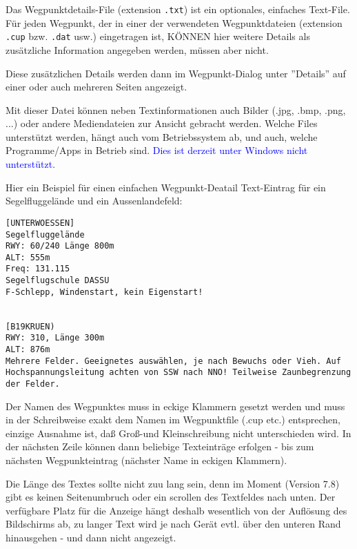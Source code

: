 %
%
%

Das Wegpunktdetails-File (extension \verb|.txt|) ist ein optionales, einfaches Text-File. Für jeden Wegpunkt, der in einer der verwendeten Wegpunktdateien (extension \verb|.cup| bzw. \verb|.dat| usw.) eingetragen ist, KÖNNEN hier weitere Details als zusätzliche Information angegeben werden, müssen aber nicht. 

Diese zusätzlichen Details werden dann im Wegpunkt-Dialog unter ''Details'' auf einer oder auch mehreren Seiten angezeigt.

Mit dieser Datei können neben Textinformationen auch Bilder (.jpg, .bmp, .png, ...) oder andere Mediendateien zur Ansicht gebracht werden. Welche Files unterstützt werden, hängt auch vom Betriebssystem ab, und auch, welche Programme/Apps in Betrieb sind. \textcolor{blue}{Dies ist derzeit unter Windows nicht unterstützt.} 

Hier ein Beispiel für einen einfachen Wegpunkt-Deatail Text-Eintrag für ein Segelfluggelände und ein
Aussenlandefeld:

\begin{verbatim}
[UNTERWOESSEN]
Segelfluggelände
RWY: 60/240 Länge 800m
ALT: 555m
Freq: 131.115
Segelflugschule DASSU 
F-Schlepp, Windenstart, kein Eigenstart!


[B19KRUEN)
RWY: 310, Länge 300m
ALT: 876m
Mehrere Felder. Geeignetes auswählen, je nach Bewuchs oder Vieh. Auf Hochspannungsleitung achten von SSW nach NNO! Teilweise Zaunbegrenzung der Felder.
\end{verbatim}



Der Namen des Wegpunktes muss in eckige Klammern gesetzt werden und muss in der Schreibweise exakt dem Namen im Wegpunktfile (.cup etc.) entsprechen, einzige Ausnahme ist, daß Groß-und Kleinschreibung nicht unterschieden wird.
In der nächsten Zeile können dann beliebige Texteinträge erfolgen - bis zum nächsten Wegpunkteintrag (nächster Name in eckigen Klammern).

Die Länge des Textes sollte nicht zuu lang sein, denn im Moment (Version 7.8) gibt es keinen Seitenumbruch oder ein scrollen des Textfeldes nach unten. Der verfügbare Platz für die Anzeige hängt deshalb wesentlich von der Auflösung des Bildschirms ab, zu langer Text wird je nach Gerät evtl. über den unteren Rand hinausgehen - und dann nicht angezeigt.

